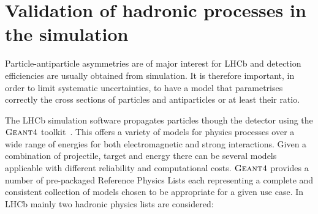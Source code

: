 \section{Validation of hadronic processes in the simulation}

Particle-antiparticle asymmetries are of major interest for LHCb and detection efficiencies are usually obtained from simulation.
It is therefore important, in order to limit systematic uncertainties, to have a model that parametrises
correctly the cross sections of particles and antiparticles or at least their ratio.

The LHCb simulation software propagates particles though the detector using the $\textsc{Geant4}$ toolkit~\cite{Alves:2008zz}.
This offers a variety of models for physics processes over a wide range of energies for both electromagnetic and strong interactions.
Given a combination of projectile, target and energy there can be several models applicable with different reliability
and computational costs. $\textsc{Geant4}$ provides a number of pre-packaged Reference Physics Lists each representing a complete
and consistent collection of models chosen to be appropriate for a given use case. In LHCb mainly two hadronic physics
lists are considered:

